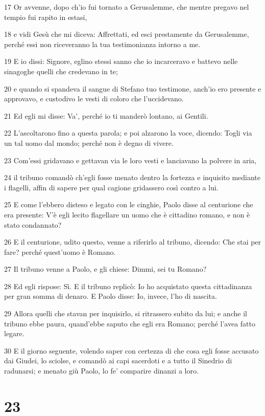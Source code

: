 \par 17 Or avvenne, dopo ch'io fui tornato a Gerusalemme, che mentre pregavo nel tempio fui rapito in estasi,
\par 18 e vidi Gesù che mi diceva: Affrettati, ed esci prestamente da Gerusalemme, perché essi non riceveranno la tua testimonianza intorno a me.
\par 19 E io dissi: Signore, eglino stessi sanno che io incarceravo e battevo nelle sinagoghe quelli che credevano in te;
\par 20 e quando si spandeva il sangue di Stefano tuo testimone, anch'io ero presente e approvavo, e custodivo le vesti di coloro che l'uccidevano.
\par 21 Ed egli mi disse: Va', perché io ti manderò lontano, ai Gentili.
\par 22 L'ascoltarono fino a questa parola; e poi alzarono la voce, dicendo: Togli via un tal uomo dal mondo; perché non è degno di vivere.
\par 23 Com'essi gridavano e gettavan via le loro vesti e lanciavano la polvere in aria,
\par 24 il tribuno comandò ch'egli fosse menato dentro la fortezza e inquisito mediante i flagelli, affin di sapere per qual cagione gridassero così contro a lui.
\par 25 E come l'ebbero disteso e legato con le cinghie, Paolo disse al centurione che era presente: V'è egli lecito flagellare un uomo che è cittadino romano, e non è stato condannato?
\par 26 E il centurione, udito questo, venne a riferirlo al tribuno, dicendo: Che stai per fare? perché quest'uomo è Romano.
\par 27 Il tribuno venne a Paolo, e gli chiese: Dimmi, sei tu Romano?
\par 28 Ed egli rispose: Sì. E il tribuno replicò: Io ho acquistato questa cittadinanza per gran somma di denaro. E Paolo disse: Io, invece, l'ho di nascita.
\par 29 Allora quelli che stavan per inquisirlo, si ritrassero subito da lui; e anche il tribuno ebbe paura, quand'ebbe saputo che egli era Romano; perché l'avea fatto legare.
\par 30 E il giorno seguente, volendo saper con certezza di che cosa egli fosse accusato dai Giudei, lo sciolse, e comandò ai capi sacerdoti e a tutto il Sinedrio di radunarsi; e menato giù Paolo, lo fe' comparire dinanzi a loro.

\chapter{23}

